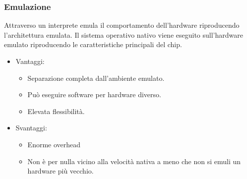 \documentclass{article}
\begin{document}
		\subsubsection{Emulazione}
		Attraverso un interprete emula il comportamento dell'hardware riproducendo l'architettura emulata. Il sistema operativo nativo viene eseguito sull'hardware emulato riproducendo le caratteristiche principali del chip. 
		\begin{itemize}
		    \item Vantaggi:
		    \begin{itemize}
		        \item Separazione completa dall'ambiente emulato.
		        \item Può eseguire software per hardware diverso.
		        \item Elevata flessibilità.
		    \end{itemize}
		    \item Svantaggi:
		    \begin{itemize}
		        \item Enorme overhead
		        \item Non è per nulla vicino alla velocità nativa a meno che non si emuli un hardware più vecchio.
		    \end{itemize}
		\end{itemize}
		
\end{document}

